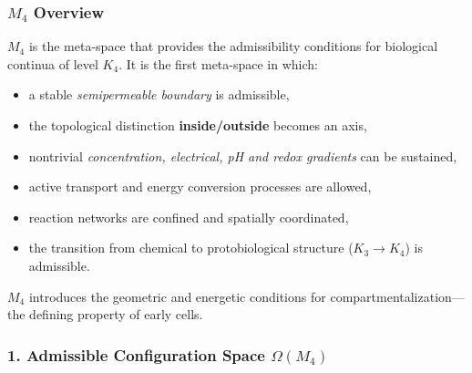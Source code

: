 

\subsubsection{\texorpdfstring{$M_4$}{M_4} Overview}
\label{sec:m4-overview}

$M_4$ is the meta-space that provides the admissibility conditions for 
biological continua of level $K_4$.  
It is the first meta-space in which:

\begin{itemize}
    \item a stable \emph{semipermeable boundary} is admissible,
    \item the topological distinction \textbf{inside/outside} becomes an axis,
    \item nontrivial \emph{concentration, electrical, pH and redox gradients} 
    can be sustained,
    \item active transport and energy conversion processes are allowed,
    \item reaction networks are confined and spatially coordinated,
    \item the transition from chemical to protobiological structure ($K_3 \to K_4$)
          is admissible.
\end{itemize}

$M_4$ introduces the geometric and energetic conditions for 
compartmentalization---the defining property of early cells.

\subsubsection*{1. Admissible Configuration Space \texorpdfstring{$\Omega(M_4)$}{\Omega(M_4)}}

